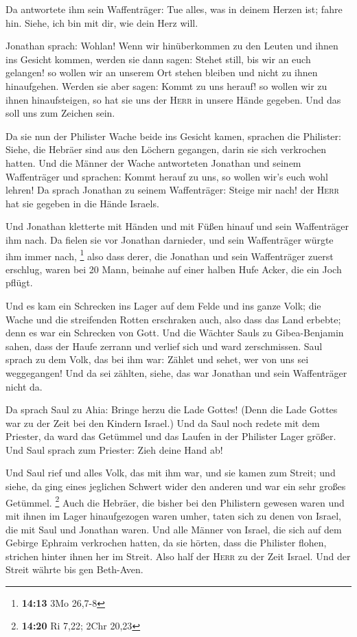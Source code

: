  Da antwortete ihm sein Waffenträger: Tue alles, was in
deinem Herzen ist; fahre hin. Siehe, ich bin mit dir, wie dein Herz
will.

 Jonathan sprach: Wohlan! Wenn wir hinüberkommen zu den
Leuten und ihnen ins Gesicht kommen,  werden sie dann
sagen: Stehet still, bis wir an euch gelangen! so wollen wir an unserem
Ort stehen bleiben und nicht zu ihnen hinaufgehen. 
Werden sie aber sagen: Kommt zu uns herauf! so wollen wir zu ihnen
hinaufsteigen, so hat sie uns der \textsc{Herr} in unsere Hände gegeben.
Und das soll uns zum Zeichen sein.

 Da sie nun der Philister Wache beide ins Gesicht kamen,
sprachen die Philister: Siehe, die Hebräer sind aus den Löchern
gegangen, darin sie sich verkrochen hatten.  Und die
Männer der Wache antworteten Jonathan und seinem Waffenträger und
sprachen: Kommt herauf zu uns, so wollen wir's euch wohl lehren! Da
sprach Jonathan zu seinem Waffenträger: Steige mir nach! der
\textsc{Herr} hat sie gegeben in die Hände Israels.

 Und Jonathan kletterte mit Händen und mit Füßen hinauf
und sein Waffenträger ihm nach. Da fielen sie vor Jonathan darnieder,
und sein Waffenträger würgte ihm immer nach, \footnote{\textbf{14:13}
  3Mo 26,7-8}  also dass derer, die Jonathan und sein
Waffenträger zuerst erschlug, waren bei 20 Mann, beinahe auf einer
halben Hufe Acker, die ein Joch pflügt.

 Und es kam ein Schrecken ins Lager auf dem Felde und ins
ganze Volk; die Wache und die streifenden Rotten erschraken auch, also
dass das Land erbebte; denn es war ein Schrecken von Gott.
 Und die Wächter Sauls zu Gibea-Benjamin sahen, dass der
Haufe zerrann und verlief sich und ward zerschmissen. 
Saul sprach zu dem Volk, das bei ihm war: Zählet und sehet, wer von uns
sei weggegangen! Und da sei zählten, siehe, das war Jonathan und sein
Waffenträger nicht da.

 Da sprach Saul zu Ahia: Bringe herzu die Lade Gottes!
(Denn die Lade Gottes war zu der Zeit bei den Kindern Israel.)
 Und da Saul noch redete mit dem Priester, da ward das
Getümmel und das Laufen in der Philister Lager größer. Und Saul sprach
zum Priester: Zieh deine Hand ab!

 Und Saul rief und alles Volk, das mit ihm war, und sie
kamen zum Streit; und siehe, da ging eines jeglichen Schwert wider den
anderen und war ein sehr großes Getümmel. \footnote{\textbf{14:20} Ri
  7,22; 2Chr 20,23}  Auch die Hebräer, die bisher bei den
Philistern gewesen waren und mit ihnen im Lager hinaufgezogen waren
umher, taten sich zu denen von Israel, die mit Saul und Jonathan waren.
 Und alle Männer von Israel, die sich auf dem Gebirge
Ephraim verkrochen hatten, da sie hörten, dass die Philister flohen,
strichen hinter ihnen her im Streit.  Also half der
\textsc{Herr} zu der Zeit Israel. Und der Streit währte bis gen
Beth-Aven.

